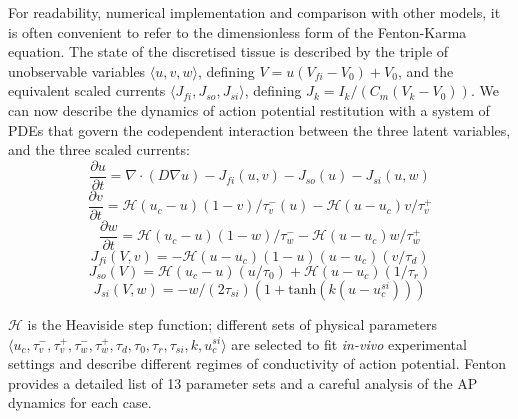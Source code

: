 \documentclass{article}
\begin{document}
        For readability, numerical implementation and comparison with other models, it is often convenient to refer to the dimensionless form of the Fenton-Karma equation.
        The state of the discretised tissue is described by the triple of unobservable variables $\langle u, v, w \rangle$, defining $V = u(V_{fi} -V_0) + V_0$, and the equivalent scaled currents $\langle J_{fi}, J_{so}, J_{si} \rangle$, defining $J_k = I_k / (C_m(V_{k} - V_0))$.
        We can now describe the dynamics of action potential restitution with a system of PDEs that govern the codependent interaction between the three latent variables, and the three scaled currents:
        \begin{equation}
            \frac{\partial u}{\partial t} = \nabla \cdot (D \nabla u) - {J_{fi}(u , v) - J_{so}(u) - J_{si}(u, w)}
        \end{equation}  
        \begin{equation}
            \frac{\partial v}{\partial t} = \mathcal{H}(u_c - u)(1-v)/\tau_v^-(u) - \mathcal{H}(u-u_c)v/\tau_v^+
        \end{equation}  
        \begin{equation}
            \frac{\partial w}{\partial t} = \mathcal{H}(u_c - u)(1-w)/\tau_w^- - \mathcal{H}(u-u_c)w/\tau_w^+
        \end{equation}          
        \begin{equation}
            J_{fi}(V, v) = - \mathcal{H}(u-u_c)(1-u)(u-u_c) (v/\tau_d)
        \end{equation}   
        \begin{equation}
            J_{so}(V) = \mathcal{H}(u_c-u)(u/\tau_0) + \mathcal{H}(u-u_c)(1/\tau_r)
        \end{equation}
        \begin{equation}
            J_{si}(V, w) = -w/(2\tau_{si}) (1+ \text{tanh}(k(u-u_c^{si})))
        \end{equation}
        
        $\mathcal{H}$ is the Heaviside step function; different sets of physical parameters $\langle u_c, \tau_v^-, \tau_v^+, \tau_w^-, \tau_w^+, \tau_d, \tau_0, \tau_r, \tau_{si}, k, u_c^{si} \rangle$ are selected to fit \emph{in-vivo} experimental settings and describe different regimes of conductivity of action potential.
        Fenton\cite{Fenton2002} provides a detailed list of 13 parameter sets and a careful analysis of the AP dynamics for each case.
        
\end{document}
